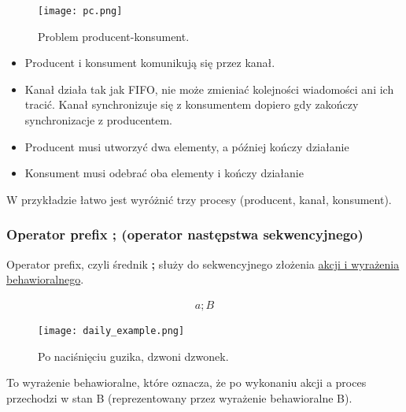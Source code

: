 \documentclass[a4paper,15pt]{article}
\newcommand{\example}[2]{
    \begin{tcolorbox}[colback=blue!5!white,colframe=blue,title={Przykład #1}]
        #2
    \end{tcolorbox}
}
\begin{document}
\example{Producent-Konsument}{

\begin{figure}[H]
\centerline{\texttt{[image: pc.png]}}
\caption{Problem producent-konsument.}
\label{fig:pc}
\end{figure}
\begin{itemize}
\item Producent i konsument komunikują się przez kanał. 
\item Kanał działa tak jak FIFO, nie może zmieniać kolejności wiadomości ani ich tracić. Kanał synchronizuje się z konsumentem dopiero gdy zakończy synchronizacje z producentem.  
\item Producent musi utworzyć dwa elementy, a później kończy działanie
\item Konsument musi odebrać oba elementy i kończy działanie
\end{itemize}
W przykładzie łatwo jest wyróżnić trzy procesy (producent, kanał, konsument).
}



\newpage
\subsubsection{Operator prefix ; (operator następstwa sekwencyjnego)}
Operator prefix, czyli średnik \textbf{;} służy do sekwencyjnego złożenia \underline{akcji i wyrażenia behawioralnego}.
\example{}{
\begin{align*}
a; B
\end{align*}

\begin{figure}[H]
\centerline{\texttt{[image: daily\_example.png]}}
\caption{Po naciśnięciu guzika, dzwoni dzwonek.}
\label{fig:daily_example}
\end{figure}

To wyrażenie behawioralne, które oznacza, że po wykonaniu akcji a proces przechodzi w stan B (reprezentowany przez wyrażenie behawioralne B).
}
\end{document}
